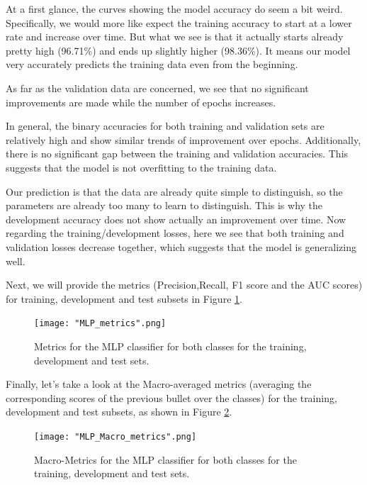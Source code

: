 \documentclass[10pt, a4paper]{article}
\begin{document}
    At a first glance, the curves showing the model accuracy do seem a bit weird. Specifically, we would more like expect the training accuracy to start at a lower rate and increase over time. But what we see is that it actually starts already pretty high (96.71\%) and ends up slightly higher (98.36\%). It means our model very accurately predicts the training data even from the beginning.

    
    As far as the validation data are concerned, we see that no significant improvements are made while the number of epochs increases.

    
    In general, the binary accuracies for both training and validation sets are relatively high and show similar trends of improvement over epochs. Additionally, there is no significant gap between the training and validation accuracies. This suggests that the model is not overfitting to the training data. 

    Our prediction is that the data are already quite simple to distinguish, so the parameters are already too many to learn to distinguish. This is why the development accuracy does not show actually an improvement over time. 
    Now regarding the training/development losses, here we see that both training and validation losses decrease together, which suggests that the model is generalizing well.

    Next, we will provide the metrics (Precision,Recall, F1 score and the AUC scores) for training, development and test subsets in Figure \ref{fig::mlp_metrics}.

    \begin{figure}
	    \centering
            \texttt{[image: "MLP\_metrics".png]}
	    \caption{Metrics for the MLP classifier for both classes for the training, development and test sets.}
	    \label{fig::mlp_metrics}
    \end{figure}

    



    Finally, let’s take a look at the Macro-averaged metrics (averaging the corresponding scores of the previous bullet over the classes) for the training, development and test subsets, as shown in Figure \ref{fig::mlp_macro_metrics}.

    \begin{figure}
	    \centering
            \texttt{[image: "MLP\_Macro\_metrics".png]}
	    \caption{Macro-Metrics for the MLP classifier for both classes for the training, development and test sets.}
	    \label{fig::mlp_macro_metrics}
    \end{figure}

    

	\printbibliography
	
\end{document}
